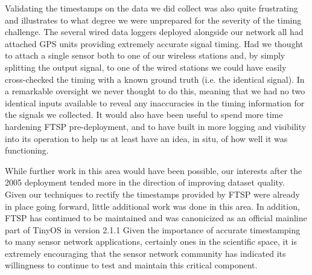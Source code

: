 Validating the timestamps on the data we did collect was also quite
frustrating and illustrates to what degree we were unprepared for the
severity of the timing challenge.  The several wired data loggers deployed
alongside our network all had attached GPS units providing extremely accurate
signal timing.  Had we thought to attach a single sensor both to one of our
wireless stations and, by simply splitting the output signal, to one of the
wired stations we could have easily cross-checked the timing with a known
ground truth (i.e. the identical signal).  In a remarkable oversight we never
thought to do this, meaning that we had no two identical inputs available to
reveal any inaccuracies in the timing information for the signals we
collected.  It would also have been useful to spend more time hardening FTSP
pre-deployment, and to have built in more logging and visibility into its
operation to help us at least have an idea, in situ, of how well it
was functioning.

While further work in this area would have been possible, our interests after
the 2005 deployment tended more in the direction of improving dataset
quality. Given our techniques to rectify the timestamps provided by FTSP were
already in place going forward, little additional work was done in this area.
In addition, FTSP has continued to be maintained and was canonicized as an
official mainline part of TinyOS in version 2.1.1 Given the importance of
accurate timestamping to many sensor network applications, certainly ones in
the scientific space, it is extremely encouraging that the sensor network
community has indicated its willingness to continue to test and maintain this
critical component.
